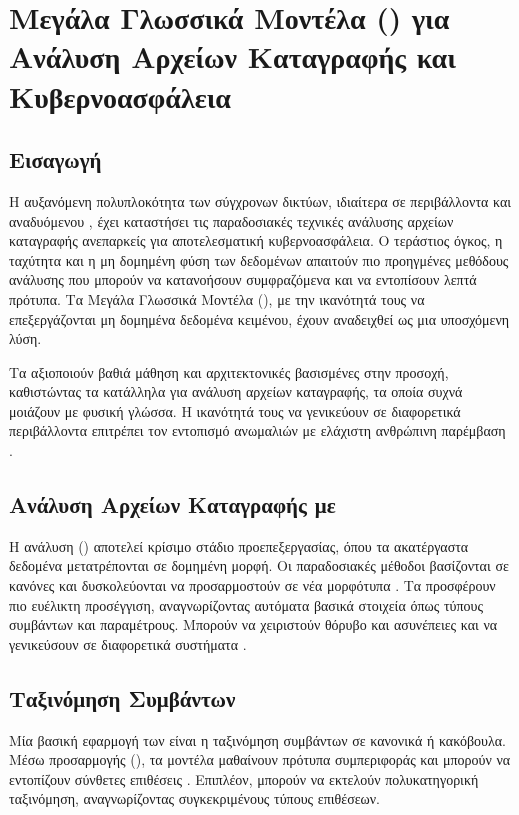 \section{Μεγάλα Γλωσσικά Μοντέλα () για Ανάλυση Αρχείων Καταγραφής και Κυβερνοασφάλεια}

\subsection{Εισαγωγή}

Η αυξανόμενη πολυπλοκότητα των σύγχρονων δικτύων, ιδιαίτερα σε περιβάλλοντα  και αναδυόμενου , έχει καταστήσει τις παραδοσιακές τεχνικές ανάλυσης αρχείων καταγραφής ανεπαρκείς για αποτελεσματική κυβερνοασφάλεια. Ο τεράστιος όγκος, η ταχύτητα και η μη δομημένη φύση των δεδομένων απαιτούν πιο προηγμένες μεθόδους ανάλυσης που μπορούν να κατανοήσουν συμφραζόμενα και να εντοπίσουν λεπτά πρότυπα. Τα Μεγάλα Γλωσσικά Μοντέλα (), με την ικανότητά τους να επεξεργάζονται μη δομημένα δεδομένα κειμένου, έχουν αναδειχθεί ως μια υποσχόμενη λύση.

Τα  αξιοποιούν βαθιά μάθηση και αρχιτεκτονικές βασισμένες στην προσοχή, καθιστώντας τα κατάλληλα για ανάλυση αρχείων καταγραφής, τα οποία συχνά μοιάζουν με φυσική γλώσσα. Η ικανότητά τους να γενικεύουν σε διαφορετικά περιβάλλοντα επιτρέπει τον εντοπισμό ανωμαλιών με ελάχιστη ανθρώπινη παρέμβαση \cite{zhang2023llmsecurity}.

\subsection{Ανάλυση Αρχείων Καταγραφής με }

Η ανάλυση () αποτελεί κρίσιμο στάδιο προεπεξεργασίας, όπου τα ακατέργαστα δεδομένα μετατρέπονται σε δομημένη μορφή. Οι παραδοσιακές μέθοδοι βασίζονται σε κανόνες και δυσκολεύονται να προσαρμοστούν σε νέα μορφότυπα \cite{he2017drain}. Τα  προσφέρουν πιο ευέλικτη προσέγγιση, αναγνωρίζοντας αυτόματα βασικά στοιχεία όπως τύπους συμβάντων και παραμέτρους. Μπορούν να χειριστούν θόρυβο και ασυνέπειες και να γενικεύσουν σε διαφορετικά συστήματα \cite{liu2023logllm}.

\subsection{Ταξινόμηση Συμβάντων}

Μία βασική εφαρμογή των  είναι η ταξινόμηση συμβάντων σε κανονικά ή κακόβουλα. Μέσω προσαρμογής (), τα μοντέλα μαθαίνουν πρότυπα συμπεριφοράς και μπορούν να εντοπίζουν σύνθετες επιθέσεις \cite{nguyen2018deep}. Επιπλέον, μπορούν να εκτελούν πολυκατηγορική ταξινόμηση, αναγνωρίζοντας συγκεκριμένους τύπους επιθέσεων.

